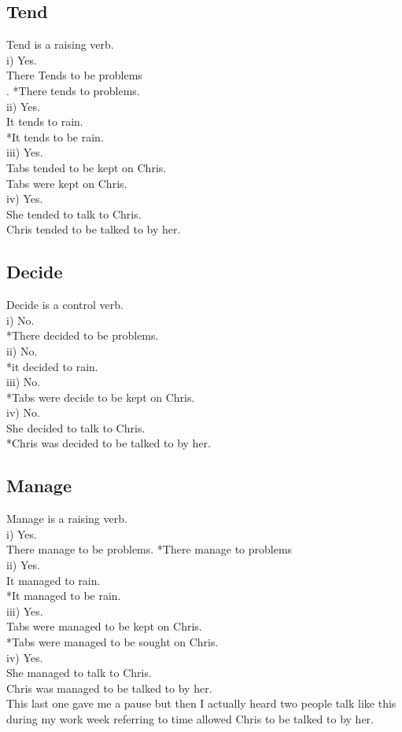 \documentclass{article}
\begin{document}
\subsection{Tend}
Tend is a raising verb. \\
i) Yes. \\ There Tends to be problems\\. *There tends to problems.\\
ii) Yes. \\  It tends to rain. \\ *It tends to be rain.\\
iii) Yes. \\ Tabs tended to be kept on Chris.\\ Tabs were kept on Chris. \\
iv) Yes. \\ She tended to talk to Chris. \\Chris tended to be talked to by her.
\subsection{Decide}
Decide is a control verb. \\
i) No. \\  *There decided to be problems. \\
ii) No. \\  *it decided to rain. \\
iii) No. \\  *Tabs were decide to be kept on Chris. \\
iv) No. \\  She decided to talk to Chris.\\ *Chris was decided to be talked to by her. \\
\subsection{Manage}
Manage is a raising verb.\\
i) Yes. \\ There manage to be problems. *There manage to problems \\
ii) Yes. \\ It managed to rain. \\ *It managed to be rain. \\
iii) Yes. \\ Tabs were managed to be kept on Chris. \\ *Tabs were managed to be sought on Chris. \\
iv) Yes. \\ She managed to talk to Chris. \\ Chris was managed to be talked to by her. \\ This last one gave me a pause but then I actually heard two people talk like this during my work week referring to time allowed Chris to be talked to by her. 
\end{document}
